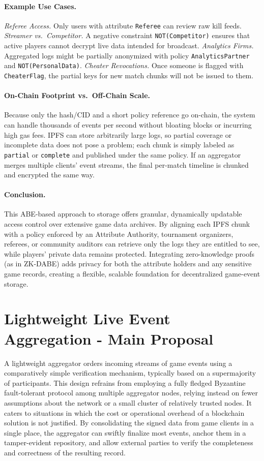\documentclass[11pt]{article}
\begin{document}
\paragraph{Example Use Cases.}
\textit{Referee Access.} Only users with attribute \texttt{Referee} can review raw kill feeds.  
\textit{Streamer vs.\ Competitor.} A negative constraint \texttt{NOT(Competitor)} ensures that active players cannot decrypt live data intended for broadcast.  
\textit{Analytics Firms.} Aggregated logs might be partially anonymized with policy \texttt{AnalyticsPartner} and \texttt{NOT(PersonalData)}.  
\textit{Cheater Revocations.} Once someone is flagged with \texttt{CheaterFlag}, the partial keys for new match chunks will not be issued to them.

\paragraph{On-Chain Footprint vs.\ Off-Chain Scale.}
Because only the hash/CID and a short policy reference go on-chain, the system can handle thousands of events per second without bloating blocks or incurring high gas fees. IPFS can store arbitrarily large logs, so partial coverage or incomplete data does not pose a problem; each chunk is simply labeled as \texttt{partial} or \texttt{complete} and published under the same policy. If an aggregator merges multiple clients’ event streams, the final per-match timeline is chunked and encrypted the same way.

\paragraph{Conclusion.}
This ABE-based approach to storage offers granular, dynamically updatable access control over extensive game data archives. By aligning each IPFS chunk with a policy enforced by an Attribute Authority, tournament organizers, referees, or community auditors can retrieve only the logs they are entitled to see, while players’ private data remains protected. Integrating zero-knowledge proofs (as in ZK-DABE) adds privacy for both the attribute holders and any sensitive game records, creating a flexible, scalable foundation for decentralized game-event storage. 

\section{Lightweight Live Event Aggregation - Main Proposal}
\label{sec:lightweightMain}
A lightweight aggregator orders incoming streams of game events using a comparatively simple verification mechanism, typically based on a supermajority of participants. This design refrains from employing a fully fledged Byzantine fault-tolerant protocol among multiple aggregator nodes, relying instead on fewer assumptions about the network or a small cluster of relatively trusted nodes. It caters to situations in which the cost or operational overhead of a blockchain solution is not justified. By consolidating the signed data from game clients in a single place, the aggregator can swiftly finalize most events, anchor them in a tamper-evident repository, and allow external parties to verify the completeness and correctness of the resulting record.
\end{document}
